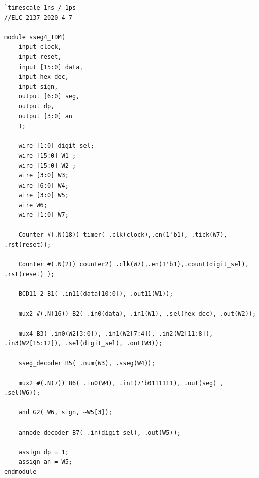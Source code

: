 \documentclass[11pt]{article}
\begin{document}
\begin{lstlisting}[style=Verilog,
caption=sseg4TDM Module,
label=sseg4TDM
]
`timescale 1ns / 1ps
//ELC 2137 2020-4-7

module sseg4_TDM(
	input clock,
	input reset,
	input [15:0] data,
	input hex_dec,
	input sign,
	output [6:0] seg,
	output dp,
	output [3:0] an
	);
	
	wire [1:0] digit_sel;    
	wire [15:0] W1 ;
	wire [15:0] W2 ;
	wire [3:0] W3;
	wire [6:0] W4;
	wire [3:0] W5;
	wire W6;    
	wire [1:0] W7;

	Counter #(.N(18)) timer( .clk(clock),.en(1'b1), .tick(W7), .rst(reset));  
	
	Counter #(.N(2)) counter2( .clk(W7),.en(1'b1),.count(digit_sel), .rst(reset) );  
	  
	BCD11_2 B1( .in11(data[10:0]), .out11(W1));
	
	mux2 #(.N(16)) B2( .in0(data), .in1(W1), .sel(hex_dec), .out(W2));
	
	mux4 B3( .in0(W2[3:0]), .in1(W2[7:4]), .in2(W2[11:8]), .in3(W2[15:12]), .sel(digit_sel), .out(W3));
	
	sseg_decoder B5( .num(W3), .sseg(W4));
	
	mux2 #(.N(7)) B6( .in0(W4), .in1(7'b0111111), .out(seg) , .sel(W6));
	
	and G2( W6, sign, ~W5[3]);
	
	annode_decoder B7( .in(digit_sel), .out(W5));

	assign dp = 1;
	assign an = W5;
endmodule


\end{lstlisting}
\end{document}
